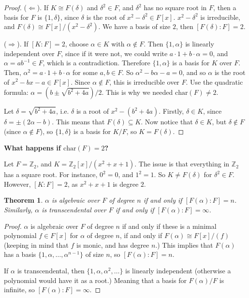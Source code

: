 \documentclass[12pt]{article}
\def\char{\text{char}}
\def\Z{{\mathbb Z}}
\newtheorem{theorem}{Theorem}
\theoremstyle{remark}
\theoremstyle{remark}
\theoremstyle{remark}
\theoremstyle{remark}
\theoremstyle{remark}
\begin{document}
\begin{proof}
  ($\Leftarrow$). If $K \cong F(\delta)$ and $\delta^2 \in F$, and $\delta^2$
  has no square root in $F$, then a basis for $F$ is $\{1, \delta\}$, since
  $\delta$ is the root of $x^2 - \delta^2 \in F[x]$. $x^2 - \delta^2$ is
  irreducible, and $F(\delta) \cong F[x] / (x^2 - \delta^2)$. We have a basis of
  size $2$, then $[F(\delta) : F] = 2$.

  ($\Rightarrow$). If $[K : F] = 2$, choose $\alpha \in K$ with $\alpha \not\in
  F$. Then $\{1, \alpha\}$ is linearly independent over $F$, since if it were
  not, we could write $a \cdot 1 + b \cdot \alpha = 0$, and $\alpha = ab^{-1}
  \in F$, which is a contradiction. Therefore $\{1, \alpha\}$ is a basis for $K$
  over $F$. Then, $\alpha^2 = a \cdot 1 + b \cdot \alpha$ for some $a, b \in F$.
  So $\alpha^2 - b \alpha - a = 0$, and so $\alpha$ is the root of $x^2 - bx - a
  \in F[x]$. Since $\alpha \not\in F$, this is irreducible over $F$. Use the
  quadratic formula: $\alpha = (b \pm \sqrt{b^2 + 4a}) / 2$. This is why we
  needed $\char(F) \ne 2$.

  Let $\delta = \sqrt{b^2 + 4a}$, i.e. $\delta$ is a root of $x^2 - (b^2 + 4a)$.
  Firstly, $\delta \in K$, since $\delta = \pm (2\alpha - b)$. This means that
  $F(\delta) \subseteq K$. Now notice that $\delta \in K$, but $\delta \not\in
  F$ (since $\alpha \not\in F$), so $\{1, \delta \}$ is a basis for $K / F$, so
  $K = F(\delta)$.
\end{proof}

{\bf What happens if $\char(F) = 2$?}

Let $F = \Z_2$, and $K = \Z_2[x] / (x^2 + x + 1)$. The issue is that everything
in $\Z_2$ has a square root. For instance, $0^2 = 0$, and $1^2 = 1$. So $K \ne
F(\delta)$ for $\delta^2 \in F$. However, $[K : F] = 2$, as $x^2 + x + 1$ is
degree $2$.

\begin{theorem}
  $\alpha$ is algebraic over $F$ of degree $n$ if and only if $[F(\alpha) : F] =
  n$. Similarly, $\alpha$ is transcendental over $F$ if and only if $[F(\alpha)
  : F] = \infty$.
\end{theorem}

\begin{proof}
  $\alpha$ is algebraic over $F$ of degree $n$ if and only if these is a minimal
  polynomial $f \in F[x]$ for $\alpha$ of degree $n$, if and only if $F(\alpha)
  \cong F[x] / (f)$ (keeping in mind that $f$ is monic, and has degree $n$.)
  This implies that $F(\alpha)$ has a basis $\{1, \alpha, \dots, \alpha^{n -
  1}\}$ of size $n$, so $[F(\alpha) : F] = n$.

  If $\alpha$ is transcendental, then $\{1, \alpha, \alpha^2, \dots\}$ is
  linearly independent (otherwise a polynomial would have it as a root.) Meaning
  that a basis for $F(\alpha) / F$ is infinite, so $[F(\alpha) : F] = \infty$.
\end{proof}
\end{document}
